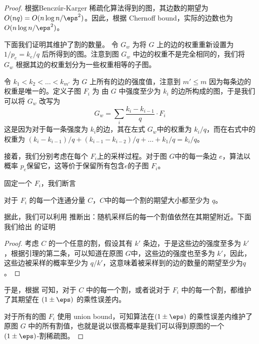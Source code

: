 \begin{proof}
    根据Benczúr-Karger 稀疏化算法得到的图，其边数的期望为 $O(nq) = O(n\log n/\eps^2)$。因此，根据 Chernoff bound，实际的边数也为 $O(n\log n/\eps^2)$。

    下面我们证明其维护了割的数量。
    令 $G_w$ 为将 $G$ 上的边的权重重新设置为 $1/p_e = k_e/q$ 后所得到的图。注意到图 $G_w$ 中边的权重不是完全相同的，我们将 $G_w$ 根据其边的权重划分为一些权重相等的子图。

    令 $k_1<k_2<\dots<k_{m'}$ 为 $G$ 上所有的边的强度值，注意到 $m'\leq m$ 因为每条边的权重是唯一的。定义子图 $F_i$ 为 由 $G$ 中强度至少为 $k_i$ 的边所构成的图，于是我们可以将 $G_w$ 改写为
    \[
    G_w=\sum_i\frac{k_i-k_{i-1}}{q}\cdot F_i
    \]
    这是因为对于每一条强度为 $k_i$的边，其在左式 $G_w$中的权重为 $k_i/q$，而在右式中的权重为 $(k_i-k_{i-1})/q+(k_{i-1}-k_{i-2})/q+\dots + k_1/q=k_i/q$。

    接着，我们分别考虑在每个 $F_i$上的采样过程。对于图 $G$中的每一条边 $e$，算法以概率 $p_e$保留它，这等价于保留所有包含$e$的子图 $F_i$。

    固定一个 $F_i$，我们断言
    \begin{claim}
    \label{clm: C-cut}
        对于 $F_i$ 的每一个连通分量 $C$，$C$中的每一个割的期望大小都至少为 $q$。
    \end{claim}
    据此，我们可以利用  推断出：随机采样后的每一个割值依然在其期望附近。下面我们给出  的证明
    \begin{proof}
        考虑 $C$ 的一个任意的割，假设其有 $k'$ 条边，于是这些边的强度至多为 $k'$，根据引理的第二条，可以知道在原图 $G$中，这些边的强度也至多为 $k'$，因此，这些边被采样的概率至少为 $q/k'$，这意味着被采样到的边的数量的期望至少为$q$。
    \end{proof}

    于是，根据  可知，对于 $C$ 中的每一个割，或者说对于 $F_i$ 中的每一个割，都维护了其期望在 $(1\pm\eps)$ 的乘性误差内。

    对于所有的图 $F_i$ 使用 union bound，可知算法在$(1\pm\eps)$ 的乘性误差内维护了原图 $G$ 中的所有割值，也就是说以很高概率是我们可以得到原图的一个 $(1\pm\eps)$-割稀疏图。
\end{proof}


